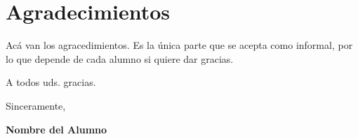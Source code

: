 \chapter*{Agradecimientos}

Acá van los agracedimientos. Es la única parte que se acepta como informal, por lo que depende de cada alumno si quiere dar gracias.

\vspace{0.2cm}
A todos uds. gracias.

\vspace{1cm}
Sinceramente,
\begin{flushright}
 \textbf{Nombre del Alumno}
\end{flushright}


